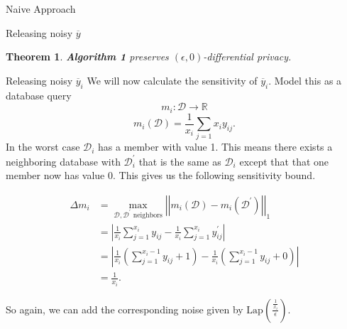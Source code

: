 \documentclass[11pt]{article}
\newtheorem{theorem}{Theorem}
\begin{document}
\begin{section}{Naive Approach}
\begin{subsection}{Releasing noisy $\overline{y}$}
\begin{theorem}{}
\textbf{Algorithm 1} preserves $(\epsilon,0)$-differential privacy.
\end{theorem}
\end{subsection}

\begin{subsection}{Releasing noisy $\overline{y}_i$}
We will now calculate the sensitivity of $\overline{y}_i$. Model this as a 
database query 
\[
m_i : \mathcal{D}\to \mathbb{R}
\]
\[
m_i(\mathcal{D}) = \frac{1}{x_i} \sum_{j=1}{x_i} y_{ij}.
\]
In the worst case $\mathcal{D}_i$ has a member with value 1. This means 
there exists a neighboring database with $\mathcal{D}_i^{'}$ that is the 
same as $\mathcal{D}_i$ except that that one member now has value 0. This 
gives us the following sensitivity bound.

\begin{align*}
\Delta m_i &= \max_{\mathcal{D},\mathcal{D}^{'} \text{ neighbors}}
  \left|\left|
    m_i(\mathcal{D}) - m_i(\mathcal{D}^{'})
  \right|\right|_1\\
&= \left|
     \frac{1}{x_i} \sum_{j=1}^{x_i} y_{ij} - 
     \frac{1}{x_i} \sum_{j=1}^{x_i} y_{ij}^{'}
   \right|\\
&= \left|
     \frac{1}{x_i} 
     \left(
       \sum_{j=1}^{x_i - 1} y_{ij} + 1
     \right) -
     \frac{1}{x_i}
     \left(
       \sum_{j=1}^{x_i - 1} y_{ij} + 0
     \right)
   \right|\\
&= \frac{1}{x_i}.
\end{align*}

So again, we can add the corresponding noise given by 
$\text{Lap}(\frac{\frac{1}{x_i}}{\epsilon})$.

\end{subsection}



\end{section}
\end{document}
